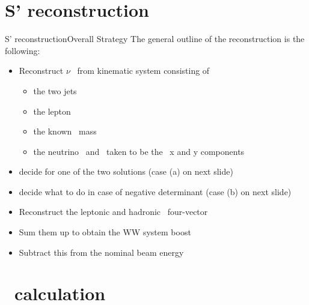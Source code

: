 \documentclass{beamer}
\newcommand{\texncmdpath}{../analysis/tex/tex_full/newcommands}
\begin{document}
\section{S' reconstruction}


\begin{frame}{S' reconstruction}{Overall Strategy}
The general outline of the reconstruction is the following:
\begin{itemize}
\item Reconstruct $\nu$ \pz\ from kinematic system consisting of
  \begin{itemize}
  \item the two jets
  \item the lepton
  \item the known \Wboson\ mass
  \item the neutrino \px\ and \py\ taken to be the \met\ x and y components
  \end{itemize}
\item decide for one of the two solutions (case (a) on next slide)
\item decide what to do in case of negative determinant (case (b) on next slide)
\item Reconstruct the leptonic and hadronic \Wboson\ four-vector
\item Sum them up to obtain the WW system boost
\item Subtract this from the nominal beam energy
\end{itemize}
\end{frame}






\section{\Xsec\ calculation}





\end{document}
